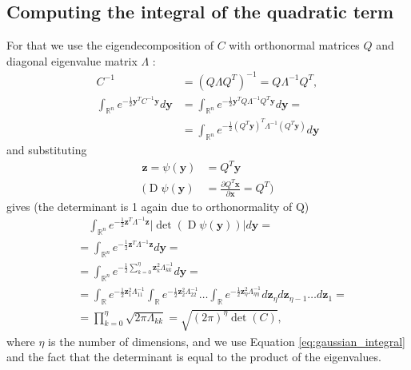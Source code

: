 \documentclass{paper}
\newcommand{\abs}[1]{\left| #1 \right|}
\newcommand{\vr}[1]{\ensuremath{\boldsymbol{#1}}}
\newcommand{\f}[1]{\operatorname{#1}}
\newcommand{\yvec}[0]{\ensuremath{\vr{y}}}
\newcommand{\zvec}[0]{\ensuremath{\vr{z}}}
\begin{document}
\subsection*{Computing the integral of the quadratic term}
For that we use the eigendecomposition of $C$ with orthonormal matrices $Q$ and diagonal eigenvalue matrix $\Lambda$ \cite{wiki_eigendecomp}:
\begin{align*}
	C^{-1} &= (Q \Lambda Q^T)^{-1} = Q \Lambda^{-1} Q^T, \nonumber \\
	\int_{\mathbb{R}^n} e^{-\frac{1}{2} \yvec^T C^{-1} \yvec}  d\yvec
	&= \int_{\mathbb{R}^n} e^{-\frac{1}{2} \yvec^T Q \Lambda^{-1} Q^T \yvec}  d\yvec =  \nonumber \\
	&= \int_{\mathbb{R}^n} e^{-\frac{1}{2} (Q^T \yvec)^T \Lambda^{-1} (Q^T \yvec)}  d\yvec
\end{align*}
and substituting
\begin{align*}
\zvec = \psi(\yvec) &= Q^T \yvec \\
\Bigg( \f{D}\psi(\yvec) &= \frac{\partial Q^T \vr{x}}{\partial \vr{x}} = Q^T \Bigg)
\end{align*}
gives (the determinant is 1 again due to orthonormality of Q)
\begin{align*}
	&\quad \int_{\mathbb{R}^n} e^{-\frac{1}{2} \zvec^T \Lambda^{-1} \zvec} \abs{\f{det}(\f{D}\psi(\yvec))} d\yvec =\\
	&= \int_{\mathbb{R}^n} e^{-\frac{1}{2} \zvec^T \Lambda^{-1} \zvec} d\yvec =\\
	&= \int_{\mathbb{R}^n} e^{-\frac{1}{2} \sum_{k=0}^\eta \zvec_k^2 \Lambda_{kk}^{-1} } d\yvec =\\
	&= \int_{\mathbb{R}} e^{-\frac{1}{2} \zvec_1^2 \Lambda_{11}^{-1} } \int_{\mathbb{R}} e^{-\frac{1}{2} \zvec_2^2 \Lambda_{22}^{-1} } \dots \int_{\mathbb{R}} e^{-\frac{1}{2} \zvec_\eta^2 \Lambda_{\eta\eta}^{-1} } d\zvec_\eta d\zvec_{\eta-1} \dots d\zvec_1 =\\
	&= \prod_{k=0}^\eta \sqrt{2 \pi \Lambda_{kk}} = \sqrt{(2 \pi)^\eta \f{det}(C)},
\end{align*}
where $\eta$ is the number of dimensions, and we use Equation \ref{eq:gaussian_integral} and the fact that the determinant is equal to the product of the eigenvalues.
\end{document}
